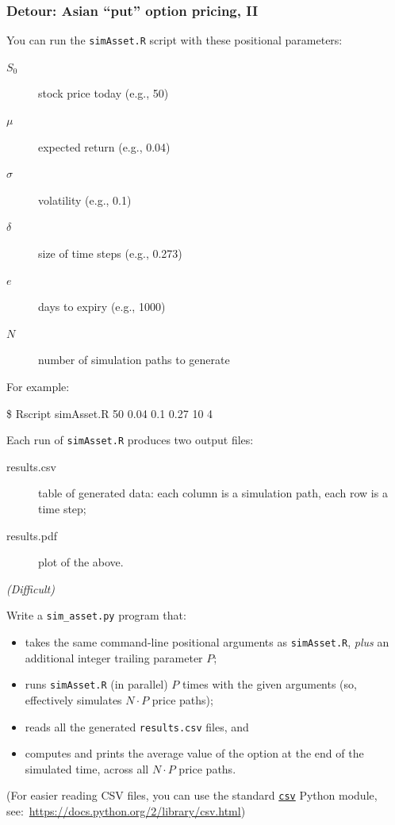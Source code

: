 \documentclass[english,serif,mathserif,xcolor=pdftex,dvipsnames,table]{beamer}
\begin{document}
\begin{frame}[fragile]
  \frametitle{Detour: Asian ``put'' option pricing, II}
  \small
  You can run the \texttt{simAsset.R} script with these positional parameters:
  \begin{description}
  \item[$S_0$] stock price today (e.g., 50)
  \item[$\mu$] expected return (e.g., 0.04)
  \item[$\sigma$] volatility (e.g., 0.1)
  \item[$\delta$] size of time steps (e.g., 0.273)
  \item[$e$] days to expiry (e.g., 1000)
  \item[$N$] number of simulation paths to generate
  \end{description}

  For example:
\begin{semiverbatim}
  \$ Rscript simAsset.R 50 0.04 0.1 0.27 10 4
\end{semiverbatim}
  
  \+ Each run of \texttt{simAsset.R} produces two output files:
  \begin{description}
  \item[results.csv] table of generated data: each column is a simulation path, each row is a time step;
  \item[results.pdf] plot of the above.
  \end{description}
\end{frame}


\begin{frame}[fragile]
  \begin{exercise*}[6.D] \emph{(Difficult)}

    \+
    Write a \texttt{sim\_asset.py} program that:
    \begin{itemize}
    \item takes the same command-line positional arguments as \texttt{simAsset.R}, \emph{plus} an additional integer trailing parameter $P$;
    \item runs \texttt{simAsset.R} (in parallel) $P$ times with the given arguments (so, effectively simulates $N \cdot P$ price paths);
    \item reads all the generated \texttt{results.csv} files, and
    \item computes and prints the average value of the option at the end of the simulated time, across all $N \cdot P$ price paths.
    \end{itemize}

    \+ {\footnotesize (For easier reading CSV files, you can use the standard
      \href{https://docs.python.org/2/library/csv.html}{\texttt{csv}}
      Python module,
      see:~\url{https://docs.python.org/2/library/csv.html})}
  \end{exercise*}
\end{frame}
\end{document}

